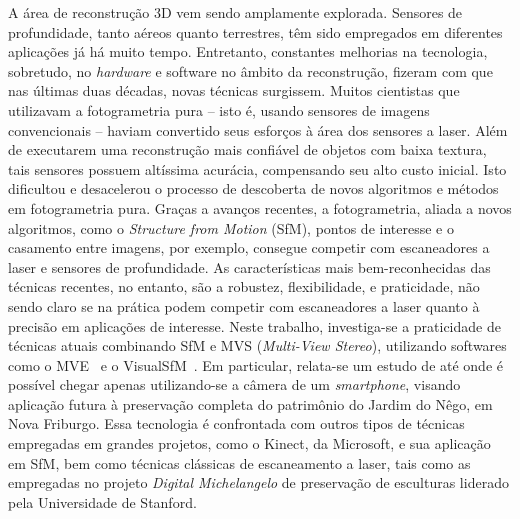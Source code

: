 \documentclass[a4paper,12pt,oneside,onecolumn,final,fleqn]{repUERJ}
\theoremstyle{plain}
\theoremstyle{definition}
\newcounter{ct}
\begin{document}
A área de reconstrução 3D vem sendo amplamente explorada. Sensores de
profundidade, tanto aéreos quanto terrestres, têm sido empregados em diferentes
aplicações já há muito tempo. Entretanto, constantes melhorias na tecnologia, sobretudo, no
\emph{hardware} e software no âmbito da reconstrução, fizeram com que
nas últimas duas décadas, novas técnicas surgissem.
Muitos cientistas que utilizavam a fotogrametria pura -- isto é, usando sensores de 
imagens convencionais -- haviam convertido seus esforços à área dos sensores a laser. Além de
executarem uma reconstrução mais confiável de objetos com baixa
textura, tais sensores possuem altíssima acurácia, compensando seu alto
custo inicial.  Isto dificultou e desacelerou o processo de descoberta de novos
algoritmos e métodos em fotogrametria pura.
Graças a avanços recentes, a fotogrametria, aliada a novos algoritmos,
como o \emph{Structure from Motion} (SfM), pontos de interesse e o casamento entre
imagens, por exemplo, consegue competir com escaneadores a laser e sensores de
profundidade. As características mais bem-reconhecidas das técnicas recentes, no
entanto, são a robustez, flexibilidade, e praticidade, não sendo claro se na prática podem 
competir com escaneadores a laser quanto à precisão em aplicações de interesse.
Neste trabalho, investiga-se a praticidade de técnicas atuais combinando SfM e MVS
(\emph{Multi-View Stereo}), utilizando softwares como o MVE~\cite{mve} e
o VisualSfM~\cite{wu2011visualsfm}. Em particular, relata-se um estudo de até
onde é possível chegar apenas utilizando-se a câmera de um \emph{smartphone}, visando
aplicação futura à preservação completa do patrimônio do Jardim do Nêgo, em Nova Friburgo.
Essa tecnologia é confrontada com outros tipos de técnicas empregadas em
grandes projetos, como o Kinect, da Microsoft, e sua aplicação em SfM, bem como técnicas clássicas de 
escaneamento a laser, tais como as empregadas no projeto \emph{Digital Michelangelo} de preservação de
esculturas liderado pela Universidade de Stanford.
\onehalfspacing

\imprimirchaves



\end{document}
